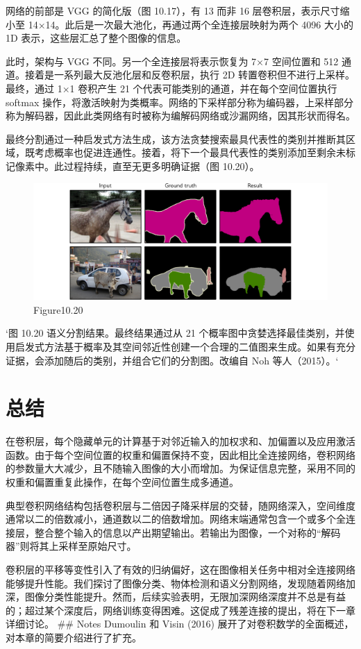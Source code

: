网络的前部是 VGG 的简化版（图 10.17），有 13 而非 16 层卷积层，表示尺寸缩小至 14×14。此后是一次最大池化，再通过两个全连接层映射为两个 4096 大小的 1D 表示，这些层汇总了整个图像的信息。

此时，架构与 VGG 不同。另一个全连接层将表示恢复为 7×7 空间位置和 512 通道。接着是一系列最大反池化层和反卷积层，执行 2D 转置卷积但不进行上采样。最终，通过 1×1 卷积产生 21 个代表可能类别的通道，并在每个空间位置执行 softmax 操作，将激活映射为类概率。网络的下采样部分称为编码器，上采样部分称为解码器，因此此类网络有时被称为编解码网络或沙漏网络，因其形状而得名。

最终分割通过一种启发式方法生成，该方法贪婪搜索最具代表性的类别并推断其区域，既考虑概率也促进连通性。接着，将下一个最具代表性的类别添加至剩余未标记像素中。此过程持续，直至无更多明确证据（图 10.20）。

\begin{figure}[h!]
\centering
\includegraphics[width=0.7\linewidth]{png/chapter10/ConvSemSegResults.png}
\caption{Figure10.20}
\end{figure}

`图 10.20 语义分割结果。最终结果通过从 21 个概率图中贪婪选择最佳类别，并使用启发式方法基于概率及其空间邻近性创建一个合理的二值图来生成。如果有充分证据，会添加随后的类别，并组合它们的分割图。改编自 Noh 等人（2015）。`
\section{总结}
在卷积层，每个隐藏单元的计算基于对邻近输入的加权求和、加偏置以及应用激活函数。由于每个空间位置的权重和偏置保持不变，因此相比全连接网络，卷积网络的参数量大大减少，且不随输入图像的大小而增加。为保证信息完整，采用不同的权重和偏置重复此操作，在每个空间位置生成多通道。

典型卷积网络结构包括卷积层与二倍因子降采样层的交替，随网络深入，空间维度通常以二的倍数减小，通道数以二的倍数增加。网络末端通常包含一个或多个全连接层，整合整个输入的信息以产出期望输出。若输出为图像，一个对称的“解码器”则将其上采样至原始尺寸。

卷积层的平移等变性引入了有效的归纳偏好，这在图像相关任务中相对全连接网络能够提升性能。我们探讨了图像分类、物体检测和语义分割网络，发现随着网络加深，图像分类性能提升。然而，后续实验表明，无限加深网络深度并不总是有益的；超过某个深度后，网络训练变得困难。这促成了残差连接的提出，将在下一章详细讨论。
## Notes
Dumoulin 和 Visin (2016) 展开了对卷积数学的全面概述，对本章的简要介绍进行了扩充。


